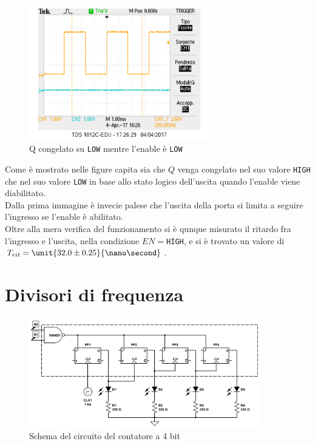 \documentclass[a4paper,10pt]{article}
\def\code#1{\texttt{#1}}
\begin{document}
\begin{figure}[H]
	\centering
	\includegraphics[width=0.7\textwidth]{../grafici/EnableDown1.png}
	\caption{Q congelato su \code{LOW} mentre l'enable è \code{LOW}}
	\label{fig:FFD}
\end{figure}

Come è mostrato nelle figure capita sia che $Q$ venga congelato nel suo valore \code{HIGH} che nel suo valore \code{LOW} in base allo stato logico dell'uscita quando l'enable viene diabilitato.\\
Dalla prima immagine è invecie palese che l'uscita della porta si limita a seguire l'ingresso se l'enable è abilitato.\\
Oltre alla mera verifica del funzionamento si è qunque misurato il ritardo fra l'ingresso e l'uscita, nella condizione $EN=$\code{HIGH}, e si è trovato un valore di $T_{rit}=\unit{32.0\pm 0.25 }{\nano\second}$.




\section{Divisori di frequenza}

\begin{figure}[H]
	\centering
	\includegraphics[width=0.9\textwidth]{../grafici/counterScheme.png}
	\caption{Schema del circuito del contatore a 4 bit}
	\label{fig:counter}
\end{figure}
\end{document}
